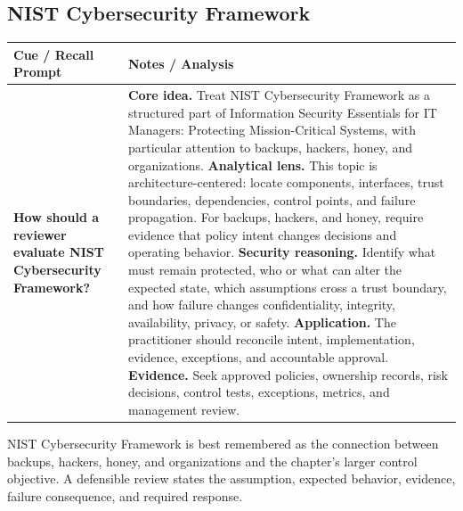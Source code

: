 \documentclass[11pt]{article}
\newcommand{\CornellHeader}{%
\rowcolor{Navy}\color{white}\bfseries Cue / Recall Prompt & \color{white}\bfseries Notes / Analysis\\\hline}
\newcommand{\CornellRow}[2]{%
\cellcolor{CueGray}\RaggedRight\textbf{#1} & \RaggedRight #2\\\hline}
\begin{document}
\subsection*{NIST Cybersecurity Framework}
\begin{longtable}{>{\RaggedRight\arraybackslash}p{}|>{\RaggedRight\arraybackslash}p{}}
\CornellHeader
\CornellRow{How should a reviewer evaluate NIST Cybersecurity Framework?}{\textbf{Core idea.} Treat NIST Cybersecurity Framework as a structured part of Information Security Essentials for IT Managers: Protecting Mission-Critical Systems, with particular attention to backups, hackers, honey, and organizations. \textbf{Analytical lens.} This topic is architecture-centered: locate components, interfaces, trust boundaries, dependencies, control points, and failure propagation. For backups, hackers, and honey, require evidence that policy intent changes decisions and operating behavior. \textbf{Security reasoning.} Identify what must remain protected, who or what can alter the expected state, which assumptions cross a trust boundary, and how failure changes confidentiality, integrity, availability, privacy, or safety. \textbf{Application.} The practitioner should reconcile intent, implementation, evidence, exceptions, and accountable approval. \textbf{Evidence.} Seek approved policies, ownership records, risk decisions, control tests, exceptions, metrics, and management review.}
\end{longtable}
\begin{topicsummary}
NIST Cybersecurity Framework is best remembered as the connection between backups, hackers, honey, and organizations and the chapter's larger control objective. A defensible review states the assumption, expected behavior, evidence, failure consequence, and required response.
\end{topicsummary}
\end{document}
